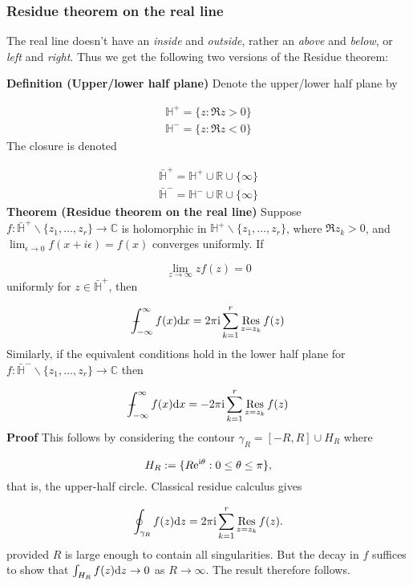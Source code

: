\documentclass[12pt,landscape]{article}
\def\D{ {\rm d} }
\def\I{ {\rm i} }
\def\E{ {\rm e} }
\def\Xint#1{ \mathchoice
   {\XXint\displaystyle\textstyle{#1} }%
   {\XXint\textstyle\scriptstyle{#1} }%
   {\XXint\scriptstyle\scriptscriptstyle{#1} }%
   {\XXint\scriptscriptstyle\scriptscriptstyle{#1} }%
   \!\int}
\def\XXint#1#2#3{ {\setbox0=\hbox{$#1{#2#3}{\int}$}
     \vcenter{\hbox{$#2#3$}}\kern-.5\wd0} }
\def\dashint{\Xint-}
\def\infdashint{\dashint_{-\infty}^\infty}
\def\dx{\D x}
\def\dz{\D z}
\begin{document}
{\subsubsection{Residue theorem on the real line}
The real line doesn't have an \emph{inside} and \emph{outside}, rather an \emph{above} and \emph{below}, or \emph{left} and \emph{right}. Thus we get the following two versions of the Residue theorem:

\textbf{Definition (Upper/lower half plane)} Denote the upper/lower half plane by


\begin{align*}
{\mathbb H}^+ = \{z : \Re z > 0 \}  \\
{\mathbb H}^- = \{z : \Re z < 0 \}
\end{align*}
The closure is denoted


\begin{align*}
\bar{\mathbb H}^+ = {\mathbb H}^+ \cup {\mathbb R} \cup \{\infty\}  \\
\bar{\mathbb H}^- = {\mathbb H}^- \cup {\mathbb R} \cup \{\infty\}
\end{align*}
\newpage
\textbf{Theorem (Residue theorem on the real line)} Suppose $f : \bar {\mathbb H}^+ \backslash \{z_1,\ldots,z_r \} \rightarrow {\mathbb C}$ is holomorphic in ${\mathbb H}^+ \backslash \{z_1,\ldots,z_r \}$, where $\Re z_k > 0$, and  $\lim_{\epsilon \rightarrow 0} f(x + i \epsilon) = f(x)$ converges uniformly.  If

\[
\lim_{z \rightarrow \infty} z f(z) = 0
\]
uniformly for $z \in \bar {\mathbb H}^+$, then

\[
\infdashint f(x) \dx = 2 \pi \I \sum_{k=1}^r {\underset{z = z_k}{\rm Res}} \, f(z)
\]
Similarly, if the equivalent conditions hold in the lower half plane for $f : \bar{\mathbb H}^- \backslash \{z_1,\ldots,z_r \} \rightarrow {\mathbb C}$ then

\[
\infdashint f(x) \dx = -2 \pi \I \sum_{k=1}^r {\underset{z = z_k}{\rm Res}} \, f(z)
\]
\newpage
\textbf{Proof} This follows by considering  the contour $\gamma_R = [-R,R] \cup H_R$ where

\[
H_R := \{ R \E^{\I \theta} : 0 \leq \theta \leq \pi \},
\]
that is, the upper-half circle. Classical residue calculus gives

\[
\oint_{\gamma_R} f(z) \dz =  2\pi \I \sum_{k=1}^r {\underset{z = z_k}{\rm Res}} \, f(z).
\]
provided $R$ is large enough to contain all singularities. But the decay in $f$ suffices to show that $\int_{H_R} f(z) \D z \rightarrow 0$ as $R \rightarrow \infty$. The result therefore follows.

}
\end{document}
